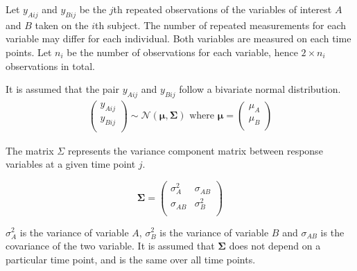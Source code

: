 \documentclass[MAIN.tex]{subfiles}
\begin{document}
Let $y_{Aij}$ and $y_{Bij}$ be the $j$th repeated observations of the variables of interest $A$ and $B$ taken on the $i$th subject. The number of repeated measurements for each variable may differ for each individual.
Both variables are measured on each time points. Let $n_{i}$ be the number of observations for each variable, hence $2\times n_{i}$ observations in total.

It is assumed that the pair $y_{Aij}$ and $y_{Bij}$ follow a bivariate normal distribution.
\begin{eqnarray*}
	\left(
	\begin{array}{c}
		y_{Aij} \\
		y_{Bij} \\
	\end{array}
	\right) \sim \mathcal{N}(
	\boldsymbol{\mu}, \boldsymbol{\Sigma})\mbox{   where } \boldsymbol{\mu} = \left(
	\begin{array}{c}
		\mu_{A} \\
		\mu_{B} \\
	\end{array}
	\right)
\end{eqnarray*}

The matrix $\Sigma$ represents the variance component matrix between response variables at a given time point $j$.

\[
\boldsymbol{\Sigma} = \left( \begin{array}{cc}
\sigma^2_{A} & \sigma_{AB} \\
\sigma_{AB} & \sigma^2_{B}\\
\end{array}   \right)
\]

$\sigma^2_{A}$ is the variance of variable $A$, $\sigma^2_{B}$ is the variance of variable $B$ and $\sigma_{AB}$ is the covariance of the two variable. It is assumed that $\boldsymbol{\Sigma}$ does not depend on a particular time point, and is the same over all time points.





\end{document}
